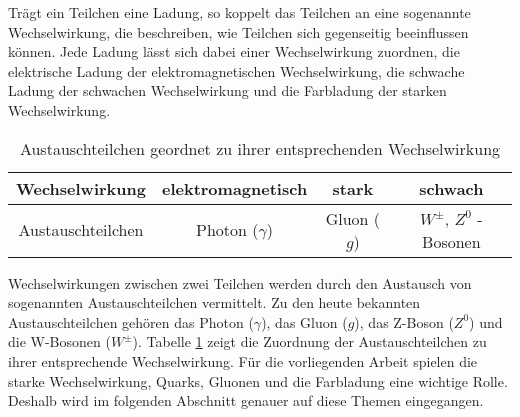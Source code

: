 Tr\"agt ein Teilchen eine Ladung, so koppelt das Teilchen an eine sogenannte Wechselwirkung, die beschreiben, wie Teilchen sich gegenseitig beeinflussen k\"onnen.
Jede Ladung l\"asst sich dabei einer Wechselwirkung zuordnen,
die elektrische Ladung der elektromagnetischen Wechselwirkung, die schwache Ladung der schwachen Wechselwirkung und die Farbladung der starken Wechselwirkung.
\begin{table}[b!]
\centering
\begin{tabular}{|c||c|c|c|}
\hline
Wechselwirkung    & elektromagnetisch & stark       & schwach                      \\ \hline
Austauschteilchen & Photon ($\gamma$) & Gluon ($g$) & $W^{\pm}$, $Z^{0}$ - Bosonen \\ \hline
\end{tabular}
\caption{Austauschteilchen geordnet zu ihrer entsprechenden Wechselwirkung}
\label{tab:Austeilchen}
\end{table}
\newline
Wechselwirkungen zwischen zwei Teilchen werden durch den Austausch von sogenannten Austauschteilchen vermittelt.
Zu den heute bekannten Austauschteilchen geh\"oren das Photon ($\gamma$), das Gluon ($g$), das Z-Boson ($Z^{0}$) und die W-Bosonen ($W^{\pm}$).
Tabelle \ref{tab:Austeilchen} zeigt die Zuordnung der Austauschteilchen zu ihrer entsprechende Wechselwirkung.
\newline
F{\"u}r die vorliegenden Arbeit spielen die starke Wechselwirkung, Quarks, Gluonen und die Farbladung eine wichtige Rolle.
Deshalb wird im folgenden Abschnitt genauer auf diese Themen eingegangen.